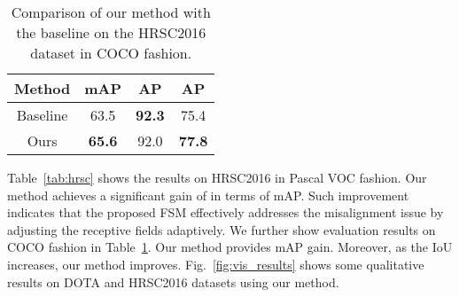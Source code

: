 \documentclass[10pt,twocolumn,letterpaper]{article}
\newcommand{\nothing}[1]{}
\renewcommand{\nothing}[1]{}
\begin{document}
\begin{table}\centering
\begin{tabular}{cccc}
\toprule
 Method&mAP &AP &  AP   \\ \hline\hline
 Baseline & 63.5 & \textbf{92.3}  & 75.4 \\
 Ours &\textbf{65.6} & 92.0 &\textbf{77.8} \\
\bottomrule
\end{tabular}
\caption{Comparison of our method with the baseline on the HRSC2016 dataset in COCO fashion.
}
\label{tab:hrsc_coco}
\end{table}
 
Table~\ref{tab:hrsc} shows the results on HRSC2016 in Pascal VOC fashion.
Our method achieves a significant gain of  in terms of mAP.
Such improvement indicates that the proposed FSM effectively addresses the misalignment issue by adjusting the receptive fields adaptively.
We further show evaluation results on COCO fashion in Table~\ref{tab:hrsc_coco}\nothing{ to compare our method with the baseline}.
Our method provides  mAP gain.
Moreover, as the IoU increases, our method improves.
Fig.~\ref{fig:vis_results} shows some qualitative results on DOTA and HRSC2016 datasets using our method.
\end{document}
